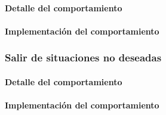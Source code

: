 \paragraph{Detalle del comportamiento}
\paragraph{Implementaci\'on del comportamiento}

\subsubsection{Salir de situaciones no deseadas}
\label{out_of_unwanted_situations}
\paragraph{Detalle del comportamiento}
\paragraph{Implementaci\'on del comportamiento}

